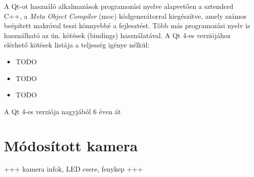 \bigskip

A Qt-ot használó alkalmazások programozási nyelve alapvetően a sztenderd C++, a \emph{Meta Object Compiler} (moc) kódgenerátorral kiegészítve, amely számos beépített makróval teszi könnyebbé a fejlesztést. Több más programozási nyelv is használható az ún. kötések (bindings) használatával. A Qt 4-es verziójához elérhető kötések listája a teljesség igénye nélkül:

\begin{itemize}
  \item TODO
  \item TODO
  \item TODO
\end{itemize}

\bigskip

A Qt 4-es verziója nagyjából 6 éven át 

\section{Módosított kamera}\label{sect:infracam}

+++ kamera infok, LED csere, fenykep +++